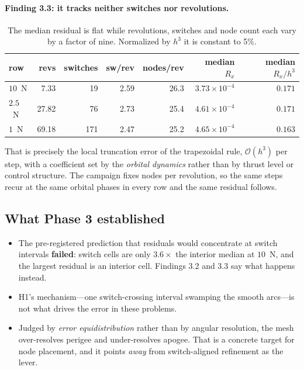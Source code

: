 \documentclass[11pt]{article}
\begin{document}
\paragraph{Finding 3.3: it tracks neither switches nor revolutions.}

\begin{table}[h]
\centering\small
\begin{tabular}{lrrrrrr}
\toprule
row & revs & switches & sw/rev & nodes/rev & median $R_x$ & \textbf{median $R_x/h^3$} \\
\midrule
$10$~N  & 7.33  & 19  & 2.59 & 26.3 & $3.73\times10^{-4}$ & $\mathbf{0.171}$ \\
$2.5$~N & 27.82 & 76  & 2.73 & 25.4 & $4.61\times10^{-4}$ & $\mathbf{0.171}$ \\
$1$~N   & 69.18 & 171 & 2.47 & 25.2 & $4.65\times10^{-4}$ & $\mathbf{0.163}$ \\
\bottomrule
\end{tabular}
\caption{The median residual is flat while revolutions, switches and node count
each vary by a factor of nine. Normalized by $h^3$ it is constant to 5\%.}
\end{table}

That is precisely the local truncation error of the trapezoidal rule,
$\mathcal{O}(h^3)$ per step, with a coefficient set by the \emph{orbital
dynamics} rather than by thrust level or control structure. The campaign fixes
nodes per revolution, so the same steps recur at the same orbital phases in
every row and the same residual follows.

\subsection{What Phase 3 established}

\begin{itemize}
  \item The pre-registered prediction that residuals would concentrate at
  switch intervals \textbf{failed}: switch cells are only $3.6\times$ the
  interior median at $10$~N, and the largest residual is an interior cell.
  Findings 3.2 and 3.3 say what happens instead.
  \item H1's mechanism---one switch-crossing interval swamping the smooth
  arcs---is not what drives the error in these problems.
  \item Judged by \emph{error equidistribution} rather than by angular
  resolution, the mesh over-resolves perigee and under-resolves apogee. That is
  a concrete target for node placement, and it points \emph{away} from
  switch-aligned refinement as the lever.
\end{itemize}
\end{document}
